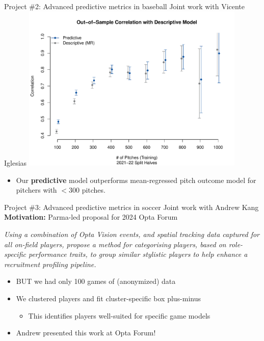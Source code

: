 \documentclass{beamer}
\begin{document}
\begin{frame}{Project \#2: Advanced predictive metrics in baseball}
  {Joint work with Vicente Iglesias}
  \centering
  \includegraphics[width = 0.8\textwidth]{images/cor_by_sample_size.pdf}
  \begin{itemize}
    \item Our {\bf predictive} model outperforms mean-regressed pitch outcome model for pitchers with $< 300$ pitches.
  \end{itemize}
\end{frame}
 

\begin{frame}{Project \#3: Advanced predictive metrics in soccer}
  {Joint work with Andrew Kang}
  {\bf Motivation:} Parma-led proposal for 2024 Opta Forum
  \begin{framed}
    \small\it
    Using a combination of Opta Vision events, and spatial tracking data captured for all on-field players, propose a method for categorising players, based on role-specific performance traits, to group similar stylistic players to help enhance a recruitment profiling pipeline. 
  \end{framed}
  \begin{itemize}
    \item BUT we had only 100 games of (anonymized) data
    \item We clustered players and fit cluster-specific box plus-minus
    \begin{itemize}
      \item This identifies players well-suited for specific game models
    \end{itemize}
    \item Andrew presented this work at Opta Forum!
  \end{itemize}
\end{frame}
\end{document}
